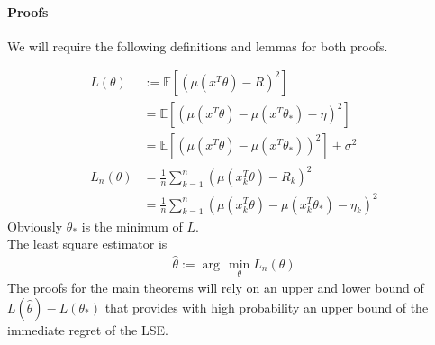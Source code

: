 \documentclass[twoside]{article} \usepackage{aistats2017}
\newcommand{\EV}[1] {
  \mathbb{E}\left[#1\right]}
\begin{document}
\paragraph{Proofs} We will require the following definitions and lemmas for both proofs.

\begin{align*}
    L(\theta) &:= \EV{(\mu(x^T\theta)-R)^2}\nonumber\\
    &= \EV{(\mu(x^T\theta)-\mu(x^T\theta_*)-\eta)^2}\\
    &=\EV{(\mu(x^T\theta)-\mu(x^T\theta_*))^2}+\sigma^2\\
    L_n(\theta) &= \frac{1}{n}\sum_{k=1}^n(\mu(x_k^T\theta)-R_k)^2\\
    &= \frac{1}{n}\sum_{k=1}^n(\mu(x_k^T\theta)-\mu(x_k^T\theta_*)-\eta_k)^2
\end{align*}
Obviously $\theta_*$ is the minimum of $L$.\\
The least square estimator is
\begin{align}
    \hat{\theta} := \arg\,\min_{\theta} L_n(\theta)
\end{align}
The proofs for the main theorems will rely on an upper and lower bound of $L(\hat{\theta})-L(\theta_*)$ that provides with high probability an upper bound of the immediate regret of the LSE.
\end{document}
